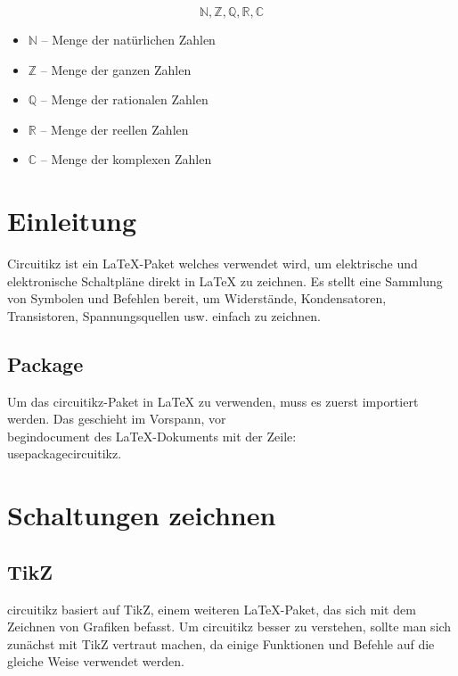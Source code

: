 \documentclass[twoside]{scrreprt}
\begin{document}
\[
\mathbb{N}, \mathbb{Z}, \mathbb{Q}, \mathbb{R}, \mathbb{C}
\]

\begin{itemize}
    \item $\mathbb{N}$ – Menge der natürlichen Zahlen
    \item $\mathbb{Z}$ – Menge der ganzen Zahlen
    \item $\mathbb{Q}$ – Menge der rationalen Zahlen
    \item $\mathbb{R}$ – Menge der reellen Zahlen
    \item $\mathbb{C}$ – Menge der komplexen Zahlen
\end{itemize}


\newpage %


\section{Einleitung} %

Circuitikz ist ein LaTeX-Paket welches verwendet wird, um elektrische und elektronische Schaltpläne direkt in LaTeX zu zeichnen. Es stellt eine Sammlung von Symbolen und Befehlen bereit, um Widerstände, Kondensatoren, Transistoren, Spannungsquellen usw. einfach zu zeichnen.

\subsection{Package}
Um das circuitikz-Paket in LaTeX zu verwenden, muss es zuerst importiert werden.
Das geschieht im Vorspann, vor \\begin{document} des LaTeX-Dokuments mit der Zeile: \\usepackage{circuitikz}.

\section{Schaltungen zeichnen}

\subsection{TikZ}
circuitikz basiert auf TikZ, einem weiteren LaTeX-Paket, das sich mit dem Zeichnen von Grafiken befasst. Um circuitikz besser zu verstehen, sollte man sich zunächst mit TikZ vertraut machen, da einige Funktionen und Befehle auf die gleiche Weise verwendet werden.
\end{document}
